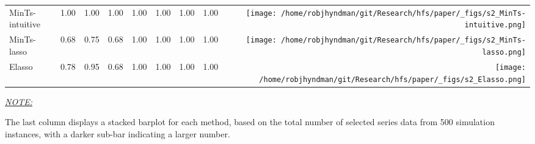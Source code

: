 \documentclass[
  12pt,
  11pt]{article}
\begin{document}
\begin{table}[!h]
\begin{threeparttable}
\begin{tabular}{llrrrrrr>{}r}
MinTs-intuitive & 1.00 & 1.00 & 1.00 & 1.00 & 1.00 & 1.00 & 1.00 & \texttt{[image: /home/robjhyndman/git/Research/hfs/paper/\_figs/s2\_MinTs-intuitive.png]}\\
MinTs-lasso & 0.68 & 0.75 & 0.68 & 1.00 & 1.00 & 1.00 & 1.00 & \texttt{[image: /home/robjhyndman/git/Research/hfs/paper/\_figs/s2\_MinTs-lasso.png]}\\
\midrule
Elasso & 0.78 & 0.95 & 0.68 & 1.00 & 1.00 & 1.00 & 1.00 & \texttt{[image: /home/robjhyndman/git/Research/hfs/paper/\_figs/s2\_Elasso.png]}\\
\bottomrule
\end{tabular}
\begin{tablenotes}[para]
\item \underline{\textit{NOTE:}} 
\item The last column displays a stacked barplot for each method, based on the total number of selected series data from 500 simulation instances, with a darker sub-bar indicating a larger number.
\end{tablenotes}
\end{threeparttable}
\endgroup{}
\end{table}
\end{document}
